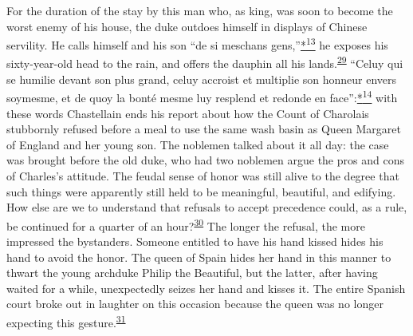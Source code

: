 For the duration of the stay by this man who, as king, was soon to
become the worst enemy of his house, the duke outdoes himself in
displays of Chinese servility. He calls himself and his son ``de si
meschans
gens,''\protect\hypertarget{09_Chapter_Two__THE_CRAVING_FOR_A_M.xhtmlux5cux23id_2307}{\protect\hyperlink{23_NOTES.xhtmlux5cux23id_2308}{*\textsuperscript{13}}}
he exposes his sixty-year-old head to the rain, and offers the dauphin
all his
lands.\textsuperscript{\protect\hypertarget{09_Chapter_Two__THE_CRAVING_FOR_A_M.xhtmlux5cux23id_2029}{\protect\hyperlink{23_NOTES.xhtmlux5cux23id_2030}{29}}}
``Celuy qui se humilie devant
\protect\hypertarget{09_Chapter_Two__THE_CRAVING_FOR_A_M.xhtmlux5cux23page_47}{}{}son
plus grand, celuy accroist et multiplie son honneur envers soymesme, et
de quoy la bonté mesme luy resplend et redonde en
face'':\protect\hypertarget{09_Chapter_Two__THE_CRAVING_FOR_A_M.xhtmlux5cux23id_2435}{\protect\hyperlink{23_NOTES.xhtmlux5cux23id_2436}{*\textsuperscript{14}}}
with these words Chastellain ends his report about how the Count of
Charolais stubbornly refused before a meal to use the same wash basin as
Queen Margaret of England and her young son. The noblemen talked about
it all day: the case was brought before the old duke, who had two
noblemen argue the pros and cons of Charles's attitude. The feudal sense
of honor was still alive to the degree that such things were apparently
still held to be meaningful, beautiful, and edifying. How else are we to
understand that refusals to accept precedence could, as a rule, be
continued for a quarter of an
hour?\textsuperscript{\protect\hypertarget{09_Chapter_Two__THE_CRAVING_FOR_A_M.xhtmlux5cux23id_2027}{\protect\hyperlink{23_NOTES.xhtmlux5cux23id_2028}{30}}}
The longer the refusal, the more impressed the bystanders. Someone
entitled to have his hand kissed hides his hand to avoid the honor. The
queen of Spain hides her hand in this manner to thwart the young
archduke Philip the Beautiful, but the latter, after having waited for a
while, unexpectedly seizes her hand and kisses it. The entire Spanish
court broke out in laughter on this occasion because the queen was no
longer expecting this
gesture.\textsuperscript{\protect\hypertarget{09_Chapter_Two__THE_CRAVING_FOR_A_M.xhtmlux5cux23id_2025}{\protect\hyperlink{23_NOTES.xhtmlux5cux23id_2026}{31}}}

